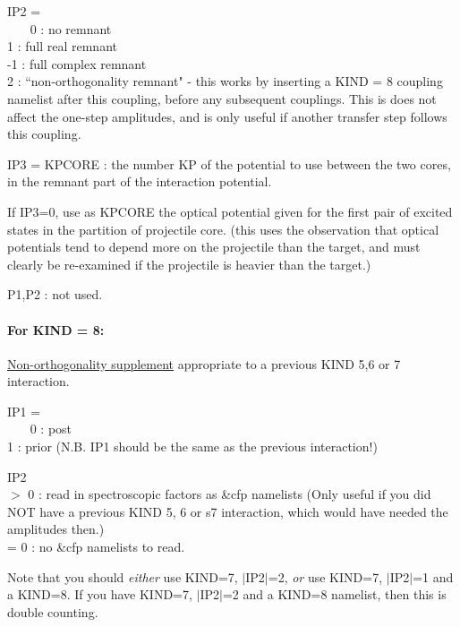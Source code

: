 \documentclass[11pt]{article}
\begin{document}
\begin{description}
IP2 =\\
~~~  0 : no remnant
\\  1 : full real remnant
\\  -1 : full complex remnant
\\  2 : ``non-orthogonality remnant" - this works by inserting
a KIND = 8 coupling namelist after this coupling, before any subsequent
couplings.
This is does not affect the one-step amplitudes, and is only useful
if another transfer step follows this coupling.



 IP3 = KPCORE : the number KP of the potential to use between
the two cores, in the remnant part of the interaction potential.

       If IP3=0, use as KPCORE the optical potential given for
the first pair of excited states in the partition of projectile core.
(this uses the observation that optical potentials tend to depend
more on the projectile than the target, and must clearly be re-examined
if the projectile is heavier than the target.)

 P1,P2 : not used.


\paragraph{For KIND = 8:}
\underline{Non-orthogonality supplement}
appropriate to a previous
KIND 5,6 or 7 interaction.


 IP1 = \\
~~~  0 : post
\\  1 : prior
 (N.B. IP1 should be the same as the previous interaction!)



IP2
\\  $>$ 0 : read in spectroscopic factors as \&cfp namelists
 (Only useful if you did NOT have a previous KIND 5, 6 or s7
interaction, which would have needed the amplitudes then.)
\\  = 0 : no \&cfp namelists to read.


Note that you should {\em either} use KIND=7, $|$IP2$|$=2,
{\em or} use  KIND=7, $|$IP2$|$=1  and a KIND=8.
If you have KIND=7, $|$IP2$|$=2 and a KIND=8 namelist, then this is
double counting.
\bigskip


\end{description}
\end{document}
